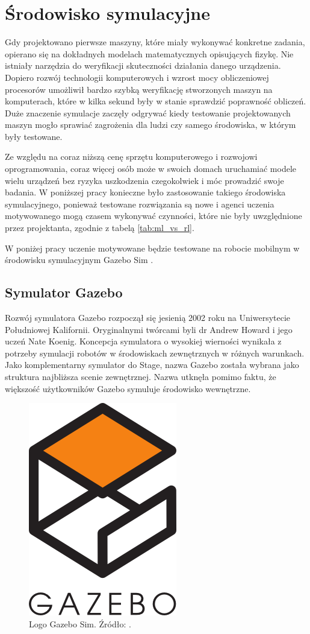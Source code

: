 \chapter{Środowisko symulacyjne}
\label{cha:rozdzial4}

Gdy projektowano pierwsze maszyny, które miały wykonywać konkretne zadania, opierano
się na dokładnych modelach matematycznych opisujących fizykę. Nie istniały narzędzia
do weryfikacji skuteczności działania danego urządzenia. Dopiero rozwój technologii
komputerowych i wzrost mocy obliczeniowej procesorów umożliwił bardzo szybką 
weryfikację stworzonych maszyn na komputerach, które w kilka sekund były w stanie 
sprawdzić poprawność obliczeń. Duże znaczenie symulacje zaczęły odgrywać kiedy
testowanie projektowanych maszyn mogło sprawiać zagrożenia dla ludzi czy samego
środowiska, w którym były testowane.

Ze względu na coraz niższą cenę sprzętu komputerowego i rozwojowi oprogramowania,
coraz więcej osób może w swoich domach uruchamiać modele wielu urządzeń bez ryzyka
uszkodzenia czegokolwiek i móc prowadzić swoje badania. W poniższej pracy konieczne
było zastosowanie takiego środowiska symulacyjnego, ponieważ testowane rozwiązania
są nowe i agenci uczenia motywowanego mogą czasem wykonywać czynności, które nie
były uwzględnione przez projektanta, zgodnie z tabelą \ref{tab:ml_vs_rl}.

W poniżej pracy uczenie motywowane będzie testowane na robocie mobilnym w środowisku
symulacyjnym Gazebo Sim \cite{gazebo_sim_website}.

\section{Symulator Gazebo}

Rozwój symulatora Gazebo rozpoczął się jesienią 2002 roku na Uniwersytecie 
Południowej Kalifornii. Oryginalnymi twórcami byli dr Andrew Howard i jego 
uczeń Nate Koenig. Koncepcja symulatora o wysokiej wierności wynikała z potrzeby 
symulacji robotów w środowiskach zewnętrznych w różnych warunkach. 
Jako komplementarny symulator do Stage, nazwa Gazebo została wybrana jako 
struktura najbliższa scenie zewnętrznej. Nazwa utknęła pomimo faktu, że 
większość użytkowników Gazebo symuluje środowisko wewnętrzne.

\begin{figure}[h]
    \centering
    \includegraphics[width=0.3\linewidth]{rozdzial5/images/gazebo_logo}
    \caption{Logo Gazebo Sim. Źródło: \cite{gazebo_sim_website}.}
    \label{fig:gazebo_logo}
\end{figure}

